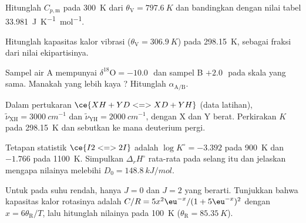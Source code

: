 \begin{exercise}[$\star\star$]\label{exo:b3:statistical-thermo-applied:7}
Hitunglah $C_{p,\mathrm m}$  pada \qty{300}{K} dari $\theta_{\mathrm V} = \qty{797.6}{K}$
dan bandingkan dengan nilai tabel \qty{33.981}{J.K^{-1}.mol^{-1}}.
\end{exercise}

\begin{exercise}[$\star\star$]\label{exo:b3:statistical-thermo-applied:8}
Hitunglah kapasitas kalor vibrasi  ($\theta_{\mathrm V} = \qty{306.9}{K}$) pada
\qty{298.15}{K}, sebagai fraksi dari nilai ekipartisinya.
\end{exercise}

\begin{exercise}[$\star\star$]\label{exo:b3:statistical-thermo-applied:9}
Sampel air A mempunyai $\delta^{18}\mathrm O = -10.0$\,\textperthousand\ dan
sampel B $+2.0$\,\textperthousand\ pada skala yang sama. Manakah yang lebih kaya
? Hitunglah  $\alpha_{\mathrm{A/B}}$.
\end{exercise}

\begin{exercise}[$\star\star\star$]\label{exo:b3:statistical-thermo-applied:10}
Dalam pertukaran $\ce{XH + YD <=> XD + YH}$ (data latihan), $\tilde\nu_{\mathrm{XH}} =
\qty{3000}{cm^{-1}}$ dan $\tilde\nu_{\mathrm{YH}} = \qty{2000}{cm^{-1}}$, dengan X dan Y
berat. Perkirakan $K$ pada \qty{298.15}{K} dan sebutkan ke mana deuterium
pergi.
\end{exercise}

\begin{exercise}[$\star\star\star$]\label{exo:b3:statistical-thermo-applied:11}
Tetapan statistik $\ce{I2 <=> 2 I}$ adalah $\log K^\circ = -3.392$ pada \qty{900}{K} dan
$-1.766$ pada \qty{1100}{K}. Simpulkan $\Delta_rH^\circ$ rata-rata pada selang itu
dan jelaskan mengapa nilainya melebihi $D_0 = \qty{148.8}{kJ/mol}$.
\end{exercise}

\begin{exercise}[$\star\star\star$]\label{exo:b3:statistical-thermo-applied:12}
Untuk  pada suhu rendah, hanya $J = 0$ dan $J = 2$ yang berarti.
Tunjukkan bahwa kapasitas kalor rotasinya adalah
$C/R = 5x^2\eu^{-x}/(1 + 5\eu^{-x})^2$ dengan $x = 6\theta_{\mathrm R}/T$, lalu hitunglah
nilainya pada \qty{100}{K} ($\theta_{\mathrm R} = \qty{85.35}{K}$).
\end{exercise}

